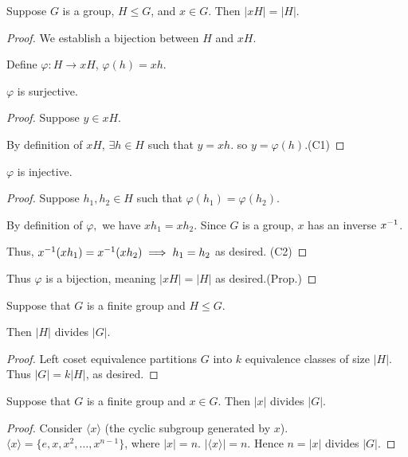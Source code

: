 \documentclass[notes.tex]{subfiles}
\begin{document}
\begin{proposition}
	Suppose $G$ is a group, $H\le G$, and $x\in G$. Then $|xH| = |H|$.
\end{proposition}
\begin{proof}
	We establish a bijection between $H$ and $xH$.

	Define $\varphi:H\to xH$, $\varphi(h) = xh$.

	\begin{claim}[1]
	 	$\varphi$ is surjective.
	 \end{claim}
	 \begin{proof}
	 	Suppose $y \in xH$.

	 	By definition of $xH$, $\exists h\in H$ such that $y=xh$. so $y=\varphi(h)$.\qedhere(C1)
	 \end{proof}
	 \begin{claim}[2]
	 	$\varphi$ is injective.
	 \end{claim}
	 \begin{proof}
	 	Suppose $h_1, h_2\in H$ such that $\varphi(h_1) = \varphi(h_2)$.

		By definition of $\varphi,$ we have $xh_1 = xh_2$. Since $G$ is a group, $x$ has an inverse ${x}^{-1}$.

		Thus, ${x}^{-1}(xh_1) = {x}^{-1}(xh_2)\implies h_1=h_2$ as desired. \qedhere(C2)
	 \end{proof}

	Thus $\varphi$ is a bijection, meaning $|xH| = |H|$ as desired.\qedhere(Prop.)
\end{proof}

\begin{theorem}[Lagrange]
	Suppose that $G$ is a finite group and $H\le G$.

	Then $|H|$ divides $|G|$.
\end{theorem}
\begin{proof}
	Left coset equivalence partitions $G$ into $k$ equivalence classes of size $|H|$. \\
\hspace{3em}
	Thus $|G| = k|H|$, as desired.
\end{proof}

\begin{corollary}
	Suppose that $G$ is a finite group and $x\in G$. Then $|x|$ divides $|G|$.
\end{corollary}

\begin{proof}
	Consider $\langle x\rangle$ (the cyclic subgroup generated by $x$).
	$\langle x\rangle = \{e, x, x^2, \ldots, x^{n-1}\}$, where $|x| = n$. $|\langle x\rangle| = n$. Hence $n = |x|$ divides $|G|$.
\end{proof}
\end{document}
